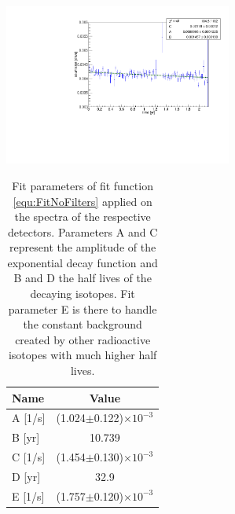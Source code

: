 \documentclass[encoding=utf8,british]{tumphthesis}
\begin{document}
\begin{table}[t!]
	\centering
	\begin{minipage}[t!]{.475\textwidth}
	\centering
	\ifmakefigures%
	\includegraphics[width=75mm]{./Bilder/doppelt.pdf}
	\fi%
	\label{fig:double}
	\end{minipage}\hfill%
    \begin{minipage}[t!]{.475\textwidth}
    \centering
    \begin{tabular}{|l|c|}
        \hline
        Name  & Value \\
        \hline
        A [1/s]    & (1.024$\pm$0.122)$\times 10^{-3}$ \\
        \hline
        B [yr] & 10.739 \\
        \hline
        C [1/s]  & (1.454$\pm$0.130)$\times 10^{-3}$ \\
        \hline
        D [yr] & 32.9 \\
        \hline
        E [1/s] & (1.757$\pm$0.120)$\times 10^{-3}$ \\
        \hline
    \end{tabular}
    \caption{
        Fit parameters of fit function \ref{equ:FitNoFilters} applied on the spectra of the respective detectors.
		Parameters A and C represent the amplitude of the exponential decay function and B and D the half lives of the decaying isotopes.
		Fit parameter E is there to handle the constant background created by other radioactive isotopes with much higher half lives.
    }
    \label{tab:doubleFitpara}
	\end{minipage}
\end{table}
\end{document}
